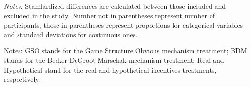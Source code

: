 \documentclass[12pt]{article}
\begin{document}
\begin{table}[htbp]
\begin{threeparttable}
\begin{tablenotes}
\item \textit{Notes: }Standardized differences are calculated between those included and excluded in the study. Number not in parentheses represent number of participants, those in parentheses represent proportions for categorical variables and standard deviations for continuous ones.
\end{tablenotes}
\end{threeparttable}
\end{table}

\clearpage


    \begin{table}[htbp!]
\centering
\caption{Standardized Differences Across Variables}
\label{tab:Appendix_std_diff_table}
\begin{tablenotes}
\item Notes: GSO stands for the Game Structure Obvious mechanism treatment; BDM stands for the Becker-DeGroot-Marschak mechanism treatment; Real and Hypothetical stand for the real and hypothetical incentives treatments, respectively.
\end{tablenotes}
\end{table}
  
\end{document}
